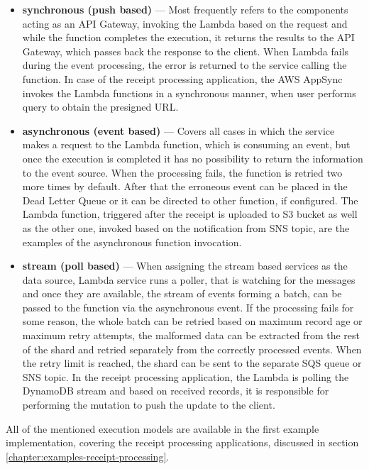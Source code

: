 \begin{itemize}
    \item \textbf{synchronous (push based)} --- Most frequently refers to the components acting as an API Gateway, invoking the Lambda based on the request and while the function completes the execution, it returns the results to the API Gateway, which passes back the response to the client.
    When Lambda fails during the event processing, the error is returned to the service calling the function.
    In case of the receipt processing application, the AWS AppSync invokes the Lambda functions in a synchronous manner, when user performs query to obtain the presigned URL.
    \item \textbf{asynchronous (event based)} --- Covers all cases in which the service makes a request to the Lambda function, which is consuming an event, but once the execution is completed it has no possibility to return the information to the event source. 
    When the processing fails, the function is retried two more times by default.
    After that the erroneous event can be placed in the Dead Letter Queue or it can be directed to other function, if configured.
    The Lambda function, triggered after the receipt is uploaded to S3 bucket as well as the other one, invoked based on the notification from SNS topic, are the examples of the asynchronous function invocation.
    \item \textbf{stream (poll based)} --- When assigning the stream based services as the data source, Lambda service runs a poller, that is watching for the messages and once they are available, the stream of events forming a batch, can be passed to the function via the asynchronous event.
    If the processing fails for some reason, the whole batch can be retried based on maximum record age or maximum retry attempts, the malformed data can be extracted from the rest of the shard and retried separately from the correctly processed events. When the retry limit is reached, the shard can be sent to the separate SQS queue or SNS topic.
    In the receipt processing application, the Lambda is polling the DynamoDB stream and based on received records, it is responsible for performing the mutation to push the update to the client.
\end{itemize}

All of the mentioned execution models are available in the first example implementation, covering the receipt processing applications, discussed in section \ref{chapter:examples-receipt-processing}.

